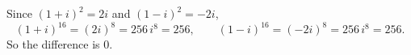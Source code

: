 Since $(1+i)^2=2i$ and $(1-i)^2=-2i$,
\[(1+i)^{16}=(2i)^8=256\,i^8=256,\qquad (1-i)^{16}=(-2i)^8=256\,i^8=256 .\]
So the difference is $\boxed{0}$.
